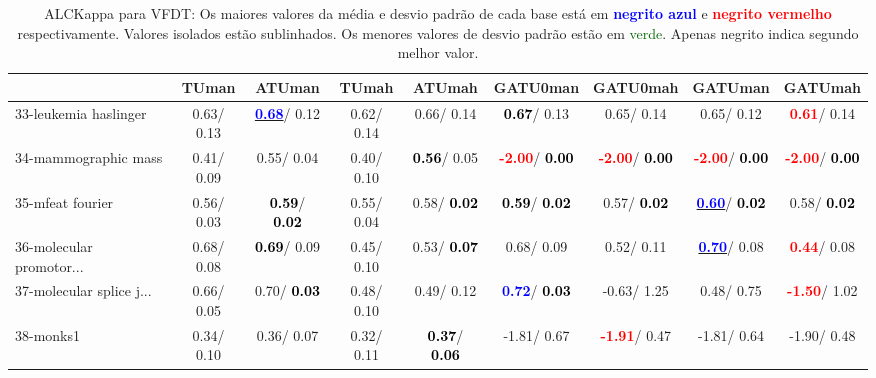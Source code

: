\begin{table}[h]
\caption{ALCKappa para VFDT: Os maiores valores da média e desvio padrão de cada base está em \textcolor{blue}{\textbf{negrito azul}} e \textcolor{red}{\textbf{negrito vermelho}} respectivamente. Valores isolados estão sublinhados. Os menores valores de desvio padrão estão em \textcolor{darkgreen}{verde}. Apenas negrito indica segundo melhor valor.}
\begin{center}\begin{tabular}{lc|c|c|c|c|c|c|c}
 & TUman & \textbf{ATUman} & TUmah & \textbf{ATUmah} & GATU0man & GATU0mah & GATUman & GATUmah\\ \hline 33-leukemia haslinger &   0.63/  0.13 & \underline{\textcolor{blue}{\textbf{  0.68}}}/  0.12 &   0.62/  0.14 &   0.66/  0.14 & \textcolor{black}{\textbf{  0.67}}/  0.13 &   0.65/  0.14 &   0.65/  0.12 & \textcolor{red}{\textbf{  0.61}}/  0.14 \\
34-mammographic mass &   0.41/  0.09 &   0.55/  0.04 &   0.40/  0.10 & \textcolor{black}{\textbf{  0.56}}/  0.05 & \textcolor{red}{\textbf{ -2.00}}/\textcolor{black}{\textbf{  0.00}} & \textcolor{red}{\textbf{ -2.00}}/\textcolor{black}{\textbf{  0.00}} & \textcolor{red}{\textbf{ -2.00}}/\textcolor{black}{\textbf{  0.00}} & \textcolor{red}{\textbf{ -2.00}}/\textcolor{black}{\textbf{  0.00}} \\
35-mfeat fourier &   0.56/  0.03 & \textcolor{black}{\textbf{  0.59}}/\textcolor{black}{\textbf{  0.02}} &   0.55/  0.04 &   0.58/\textcolor{black}{\textbf{  0.02}} & \textcolor{black}{\textbf{  0.59}}/\textcolor{black}{\textbf{  0.02}} &   0.57/\textcolor{black}{\textbf{  0.02}} & \underline{\textcolor{blue}{\textbf{  0.60}}}/\textcolor{black}{\textbf{  0.02}} &   0.58/\textcolor{black}{\textbf{  0.02}} \\
36-molecular promotor... &   0.68/  0.08 & \textcolor{black}{\textbf{  0.69}}/  0.09 &   0.45/  0.10 &   0.53/\textcolor{black}{\textbf{  0.07}} &   0.68/  0.09 &   0.52/  0.11 & \underline{\textcolor{blue}{\textbf{  0.70}}}/  0.08 & \textcolor{red}{\textbf{  0.44}}/  0.08 \\
37-molecular splice j... &   0.66/  0.05 &   0.70/\textcolor{black}{\textbf{  0.03}} &   0.48/  0.10 &   0.49/  0.12 & \textcolor{blue}{\textbf{  0.72}}/\textcolor{black}{\textbf{  0.03}} &  -0.63/  1.25 &   0.48/  0.75 & \textcolor{red}{\textbf{ -1.50}}/  1.02 \\
38-monks1 &   0.34/  0.10 &   0.36/  0.07 &   0.32/  0.11 & \textcolor{black}{\textbf{  0.37}}/\textcolor{black}{\textbf{  0.06}} &  -1.81/  0.67 & \textcolor{red}{\textbf{ -1.91}}/  0.47 &  -1.81/  0.64 &  -1.90/  0.48 \\

\end{tabular}
\end{center}
\end{table}

